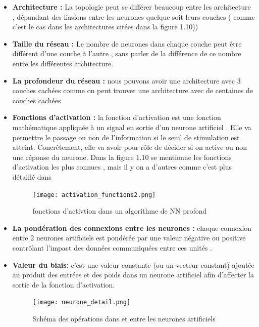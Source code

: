     \begin{itemize}[label=$\bullet$]
    \item \textbf{Architecture : }La topologie peut se différer beaucoup entre les architecture , dépandant des liasions entre les neurones quelque soit leurs couches ( comme c'est le cas dans les architectures citées dans la figure 1.10))
    
    \item \textbf{Taille du réseau :} Le nombre de neurones dans chaque couche peut être différent d'une couche à l'autre , sans parler de la différence de ce nombre entre les différentes architecture.
 
    \item \textbf{La profondeur du réseau :} nous pouvons avoir une architecture avec 3 couches cachées comme on peut trouver une architecture avec de centaines de couches cachées
    
    \item \textbf{Fonctions d’activation :} la fonction d'activation est une fonction mathématique appliquée à un signal en sortie d'un neurone artificiel . Elle va permettre le passage ou non de l’information si le seuil de stimulation est atteint. Concrètement, elle va avoir pour rôle de décider si on active ou non une réponse du neurone.
    Dans la figure 1.10 se mentionne les fonctions d'activation les plus connues , mais il y on a d'autres comme c'est plus détaillé dans \cite{nwankpa2018activation}
    
    \begin{figure}[htbp]
     \centering    \texttt{[image: activation\_functions2.png]}
     \caption{fonctions d'activtion dans un algorithme de NN profond\cite{activation_functions} }
     \label{fig:example11}
     \end{figure}
     \newpage
    \item \textbf{La pondération des connexions entre les neurones :} chaque connexion entre 2 neurones artificiels est pondérée par une valeur négative ou positive contrôlant l'impact des données communiquées entre ces unités . 
    \item \textbf{Valeur du biais:} c'est une valeur constante (ou un vecteur constant) ajoutée au produit des entrées et des poids dans un neurone artificiel afin d'affecter la sortie de la fonction d'activation.
    
    \begin{figure}[htbp]
     \centering  
     \texttt{[image: neurone\_detail.png]}
     \caption{Schéma des opérations dans et entre les neurones artificiels\cite{neurone_detail} }
     \label{fig:example12}
     \end{figure}
    

\end{itemize}
